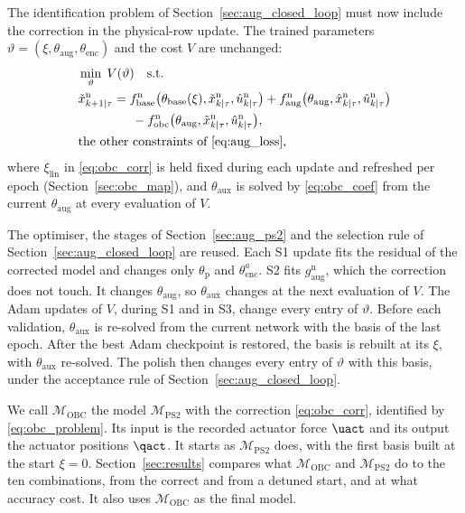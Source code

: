 The identification problem of Section~\ref{sec:aug_closed_loop} must now
include the correction in the physical-row update.
The trained parameters $\vartheta=(\xi,\theta_{\mathrm{aug}},\theta_{\mathrm{enc}})$
and the cost $V$ are unchanged:
{\small
\begin{equation}
\begin{aligned}
 &\min_{\vartheta}\;V(\vartheta)\quad\text{s.t.}\\
 &\tilde x^{\mathrm n}_{k+1|\tau}
  =f^{\mathrm n}_{\mathrm{base}}\bigl(\theta_{\mathrm{base}}(\xi),
   \tilde x^{\mathrm n}_{k|\tau},\hat u^{\mathrm n}_{k|\tau}\bigr)
  +f^{\mathrm n}_{\mathrm{aug}}\bigl(\theta_{\mathrm{aug}},
   \hat x^{\mathrm n}_{k|\tau},\hat u^{\mathrm n}_{k|\tau}\bigr)\\
 &\qquad\qquad\;-f^{\mathrm n}_{\mathrm{obc}}\bigl(\theta_{\mathrm{aug}},
   \tilde x^{\mathrm n}_{k|\tau},\hat u^{\mathrm n}_{k|\tau}\bigr),\\
 &\text{the other constraints of \eqref{eq:aug_loss}},
\end{aligned}
\label{eq:obc_problem}
\end{equation}
}
where $\xi_{\mathrm{lin}}$ in \eqref{eq:obc_corr} is held fixed during each
update and refreshed per epoch (Section~\ref{sec:obc_map}), and
$\theta_{\mathrm{aux}}$ is solved by \eqref{eq:obc_coef} from the current
$\theta_{\mathrm{aug}}$ at every evaluation of $V$.

The optimiser, the stages of Section~\ref{sec:aug_ps2} and the selection rule
of Section~\ref{sec:aug_closed_loop} are reused.
Each S1 update fits the residual of the corrected model and changes only
$\theta_{\mathrm p}$ and $\theta^a_{\mathrm{enc}}$.
S2 fits $g^{\mathrm n}_{\mathrm{aug}}$, which the correction does not touch.
It changes $\theta_{\mathrm{aug}}$, so $\theta_{\mathrm{aux}}$ changes at the
next evaluation of $V$.
The Adam updates of $V$, during S1 and in S3, change every entry of
$\vartheta$.
Before each validation, $\theta_{\mathrm{aux}}$ is re-solved from the current
network with the basis of the last epoch.
After the best Adam checkpoint is restored, the basis is rebuilt at its $\xi$,
with $\theta_{\mathrm{aux}}$ re-solved.
The polish then changes every entry of $\vartheta$ with this basis, under the
acceptance rule of Section~\ref{sec:aug_closed_loop}.

We call $\mathcal M_{\mathrm{OBC}}$ the model $\mathcal M_{\mathrm{PS2}}$ with
the correction \eqref{eq:obc_corr}, identified by \eqref{eq:obc_problem}.
Its input is the recorded actuator force $\uact$ and its output the actuator
positions $\qact$.
It starts as $\mathcal M_{\mathrm{PS2}}$ does, with the first basis built at
the start $\xi=0$.
Section~\ref{sec:results} compares what $\mathcal M_{\mathrm{OBC}}$ and
$\mathcal M_{\mathrm{PS2}}$ do to the ten combinations, from the correct and
from a detuned start, and at what accuracy cost.
It also uses $\mathcal M_{\mathrm{OBC}}$ as the final model.


